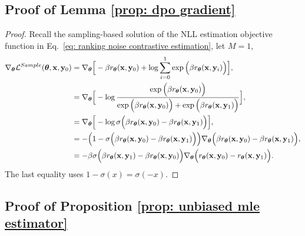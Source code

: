 \subsection{Proof of Lemma \ref{prop: dpo gradient}}
\label{sec: dpo gradient derivation}
\dpogradient*
\begin{proof}
Recall the sampling-based solution of the NLL estimation objective function in Eq.~\eqref{eq: ranking noise contrastive estimation},
let $M=1$,
\begin{align*}
\nabla_{\boldsymbol\theta} \mathcal{L}^{Sample}(\boldsymbol\theta, \mathbf{x}, \mathbf{y}_0)
& =
\nabla_{\boldsymbol\theta}
\Big[
-
\beta
r_{\boldsymbol\theta}(\mathbf{x}, \mathbf{y}_0)
+
\log
{\sum_{i=0}^1 \exp
\Big(
\beta
r_{\boldsymbol\theta}(\mathbf{x}, \mathbf{y}_i)
\Big)}
\Big],
\\ \nonumber
& =
\nabla_{\boldsymbol\theta}
\Big[
-
\log
\frac{
\exp
\Big(
\beta
r_{\boldsymbol\theta}(\mathbf{x}, \mathbf{y}_0)
\Big)
}
{
\exp
\Big(
\beta
r_{\boldsymbol\theta}(\mathbf{x}, \mathbf{y}_0)
\Big)
+
\exp
\Big(
\beta
r_{\boldsymbol\theta}(\mathbf{x}, \mathbf{y}_1)
\Big)
}
\Big],
\\ \nonumber
& =
\nabla_{\boldsymbol\theta}
\Big[
-
\log \sigma
\Big(
\beta
r_{\boldsymbol\theta}(\mathbf{x}, \mathbf{y}_0)
-
\beta
r_{\boldsymbol\theta}(\mathbf{x}, \mathbf{y}_1)
\Big)
\Big],
\\ \nonumber
& =
- \Big(1 - \sigma
\Big(
\beta
r_{\boldsymbol\theta}(\mathbf{x}, \mathbf{y}_0)
-
\beta
r_{\boldsymbol\theta}(\mathbf{x}, \mathbf{y}_1)
\Big)
\Big)
\nabla_{\boldsymbol\theta}
\Big(
\beta
r_{\boldsymbol\theta}(\mathbf{x}, \mathbf{y}_0)
-
\beta
r_{\boldsymbol\theta}(\mathbf{x}, \mathbf{y}_1)
\Big),
\\ \nonumber
& =
- \beta \sigma
\Big(
\beta
r_{\boldsymbol\theta}(\mathbf{x}, \mathbf{y}_1)
-
\beta
r_{\boldsymbol\theta}(\mathbf{x}, \mathbf{y}_0)
\Big)
\nabla_{\boldsymbol\theta}
\Big(
r_{\boldsymbol\theta}(\mathbf{x}, \mathbf{y}_0)
-
r_{\boldsymbol\theta}(\mathbf{x}, \mathbf{y}_1)
\Big).
\end{align*}
The last equality uses $1 - \sigma(x) = \sigma(-x)$.
\end{proof}



\subsection{Proof of Proposition \ref{prop: unbiased mle estimator}}
\label{sec: unbiased mle estimator}

